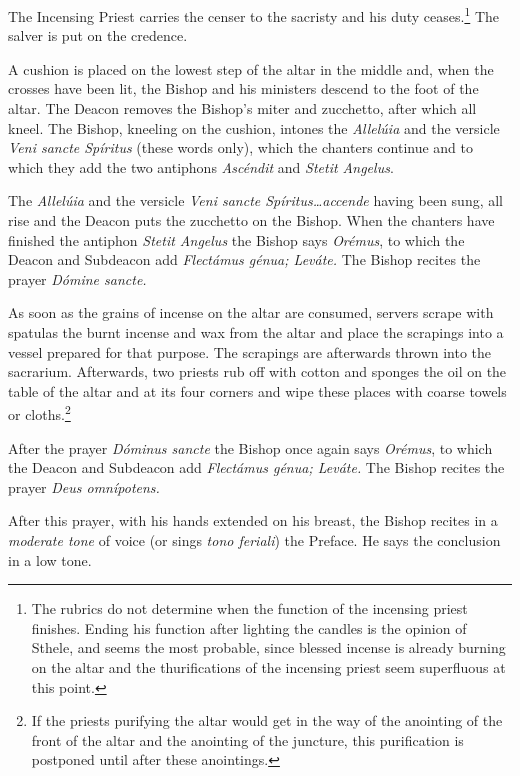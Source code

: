 \documentclass[letterpaper]{report}
\begin{document}
{    The Incensing Priest carries the censer to the sacristy and his duty
    ceases.\footnote{The rubrics do not determine when the function of the
    incensing priest finishes. Ending his function after lighting the candles
    is the opinion of Sthele, and seems the most probable, since blessed
    incense is already burning on the altar and the thurifications of the
    incensing priest seem superfluous at this point.} The salver is put
    on the credence.

    \rubric A cushion is placed on the lowest step of the altar in the middle
    and, when the crosses have been lit, the Bishop and his ministers descend
    to the foot of the altar. The Deacon removes the Bishop's miter and
    zucchetto, after which all kneel. The Bishop, kneeling on the cushion,
    intones the \textit{Allel\'uia} and the versicle \textit{Veni sancte
    Spíritus} (these words only), which the chanters continue and to which they
    add the two antiphons \textit{Ascéndit} and \textit{Stetit Angelus}.

    \rubric The \textit{Allel\'uia} and the versicle \textit{Veni sancte
    Spíritus\dots accende} having been sung, all rise and the Deacon puts the
    zucchetto on the Bishop. When the chanters have finished the antiphon
    \textit{Stetit Angelus} the Bishop says \textit{Orémus}, to which the Deacon
    and Subdeacon add \textit{Flectámus génua; Leváte.} The Bishop recites the
    prayer \textit{Dómine sancte.}

    \rubric As soon as the grains of incense on the altar are consumed, servers
    scrape with spatulas the burnt incense and wax from the altar and place the
    scrapings into a vessel prepared for that purpose. The scrapings are
    afterwards thrown into the sacrarium. Afterwards, two priests rub off with
    cotton and sponges the oil on the table of the altar and at its four
    corners and wipe these places with coarse towels or cloths.\footnote{If the
    priests purifying the altar would get in the way of the anointing of the
    front of the altar and the anointing of the juncture, this purification is
    postponed until after these anointings.}

    \rubric After the prayer \textit{Dóminus sancte} the Bishop once again says
    \textit{Orémus}, to which the Deacon and Subdeacon add \textit{Flectámus
    génua; Leváte.} The Bishop recites the prayer \textit{Deus omnípotens.}

    \rubric After this prayer, with his hands extended on his breast, the Bishop
    recites in a \textit{moderate tone} of voice (or sings \textit{tono feriali})
    the Preface. He says the conclusion in a low tone.

}
\end{document}
